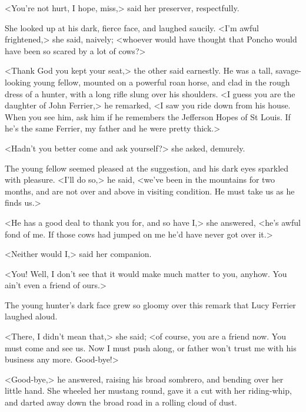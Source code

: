 <You're not hurt, I hope, miss,> said her preserver, respectfully.

She looked up at his dark, fierce face, and laughed saucily. <I'm awful frightened,> she said, naively; <whoever would have thought that Poncho would have been so scared by a lot of cows?>

<Thank God you kept your seat,> the other said earnestly. He was a tall, savage-looking young fellow, mounted on a powerful roan horse, and clad in the rough dress of a hunter, with a long rifle slung over his shoulders. <I guess you are the daughter of John Ferrier,> he remarked, <I saw you ride down from his house. When you see him, ask him if he remembers the Jefferson Hopes of St Louis. If he's the same Ferrier, my father and he were pretty thick.>

<Hadn't you better come and ask yourself?> she asked, demurely.

The young fellow seemed pleased at the suggestion, and his dark eyes sparkled with pleasure. <I'll do so,> he said, <we've been in the mountains for two months, and are not over and above in visiting condition. He must take us as he finds us.>

<He has a good deal to thank you for, and so have I,> she answered, <he's awful fond of me. If those cows had jumped on me he'd have never got over it.>

<Neither would I,> said her companion.

<You! Well, I don't see that it would make much matter to you, anyhow. You ain't even a friend of ours.>

The young hunter's dark face grew so gloomy over this remark that Lucy Ferrier laughed aloud.

<There, I didn't mean that,> she said; <of course, you are a friend now. You must come and see us. Now I must push along, or father won't trust me with his business any more. Good-bye!>

<Good-bye,> he answered, raising his broad sombrero, and bending over her little hand. She wheeled her mustang round, gave it a cut with her riding-whip, and darted away down the broad road in a rolling cloud of dust.

